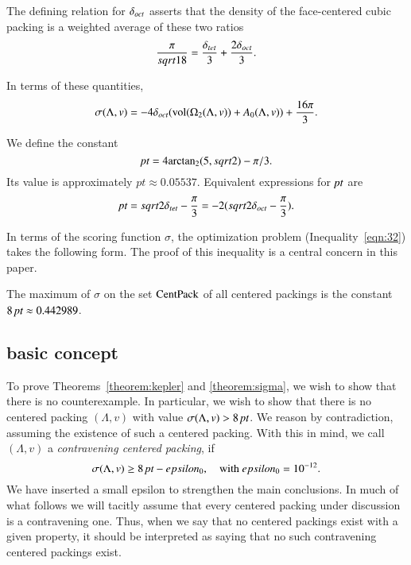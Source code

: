 \begin{remark}
The defining relation for $\delta_{oct}$ asserts that the density of the
face-centered cubic packing is a weighted average of these two
ratios
    $$\frac{\pi}{sqrt{18}} = \frac{\delta_{tet}}{3} + \frac{2 \delta_{oct}}{3}.$$
\end{remark}

In terms of these quantities,
\begin{equation}
    \sigma(\Lambda,v) = -4 \delta_{oct} ({\operatorname{vol}}(\Omega_2(\Lambda,v)) + A_0(\Lambda,v)) +
    \frac{16\pi}{3}.
\end{equation}

\begin{definition}[point,~$\pt$]\label{def:pt}
We define the constant
   $$\hbox{\it pt} = 4{\operatorname{arctan_2}}(5,sqrt2) - \pi/3.$$
Its value is approximately $pt \approx 0.05537.$  Equivalent
expressions for $\pt$ are
    $$
    \hbox{\it pt} = sqrt2 \delta_{tet} - \frac{\pi}{3} = -2 (sqrt2 \delta_{oct} -
    \frac{\pi}{3}).
    $$
\end{definition}

In terms of the scoring function $\sigma$, the optimization
problem (Inequality~\ref{eqn:32}) takes the following form. The
proof of this inequality is a central concern in this paper.

\begin{theorem}\label{theorem:sigma}
The maximum of $\sigma$ on the set ${\operatorname{CentPack}}$ of all centered
packings is the constant $8\,\hbox{\it pt}\approx 0.442989$.
\end{theorem}



\subsection{basic concept}
\label{sec:outline}

To prove Theorems~\ref{theorem:kepler} and \ref{theorem:sigma}, we
wish to show that there is no counterexample.  In particular, we
wish to show that there is no centered packing $(\Lambda,v)$ with value
$\sigma(\Lambda,v)
> 8\,\hbox{\it pt}$.  We reason by contradiction, assuming the existence of
such a centered packing.  With this in mind, we call $(\Lambda,v)$ a {\it
contravening centered packing}, if
    $$\sigma(\Lambda,v)\ge 8\,\hbox{\it pt} - epsilon_0, \quad \text{with }epsilon_0 = 10^{-12}.$$
We have inserted a small epsilon to strengthen the main
conclusions.  In much of what follows we will tacitly assume that
every centered packing under discussion is a contravening one.
Thus, when we say that no centered packings exist with a given
property, it should be interpreted as saying that no such
contravening centered packings exist.

